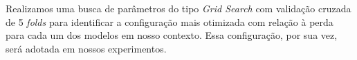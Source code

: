 

Realizamos uma busca de parâmetros do tipo \textit{Grid Search} com validação cruzada de 5 \textit{folds} para identificar a configuração mais otimizada com relação à perda para cada um dos modelos em nosso contexto. Essa configuração, por sua vez, será adotada em nossos experimentos.


